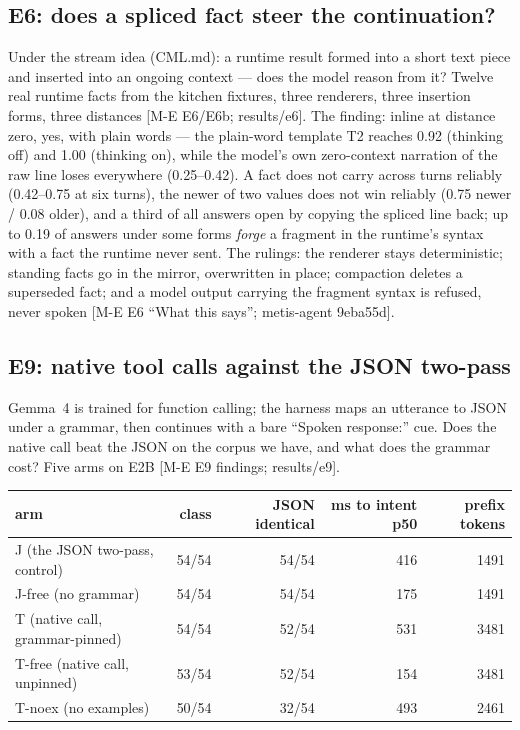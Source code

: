 \documentclass[11pt]{article}
\newcommand{\src}[1]{{\footnotesize\textsf{[#1]}}}
\begin{document}
\subsection{E6: does a spliced fact steer the continuation?}\label{sec:e6}

Under the stream idea (CML.md): a runtime result formed into a short text piece and
inserted into an ongoing context --- does the model reason from it? Twelve real runtime
facts from the kitchen fixtures, three renderers, three insertion forms, three distances
\src{M-E E6/E6b; results/e6}. The finding: inline at distance zero, yes, with plain words
--- the plain-word template T2 reaches 0.92 (thinking off) and 1.00 (thinking on), while
the model's own zero-context narration of the raw line loses everywhere (0.25--0.42). A
fact does not carry across turns reliably (0.42--0.75 at six turns), the newer of two
values does not win reliably (0.75 newer / 0.08 older), and a third of all answers open by
copying the spliced line back; up to 0.19 of answers under some forms \emph{forge} a
fragment in the runtime's syntax with a fact the runtime never sent. The rulings: the
renderer stays deterministic; standing facts go in the mirror, overwritten in place;
compaction deletes a superseded fact; and a model output carrying the fragment syntax is
refused, never spoken \src{M-E E6 ``What this says''; metis-agent 9eba55d}.

\subsection{E9: native tool calls against the JSON two-pass}\label{sec:e9}

Gemma~4 is trained for function calling; the harness maps an utterance to JSON under a
grammar, then continues with a bare ``Spoken response:'' cue. Does the native call beat
the JSON on the corpus we have, and what does the grammar cost? Five arms on E2B
\src{M-E E9 findings; results/e9}.

\begin{center}\small
\begin{tabular}{@{}lrrrr@{}}
\toprule
arm & class & JSON identical & ms to intent p50 & prefix tokens \\
\midrule
J (the JSON two-pass, control) & 54/54 & 54/54 & 416 & 1491 \\
J-free (no grammar) & 54/54 & 54/54 & 175 & 1491 \\
T (native call, grammar-pinned) & 54/54 & 52/54 & 531 & 3481 \\
T-free (native call, unpinned) & 53/54 & 52/54 & 154 & 3481 \\
T-noex (no examples) & 50/54 & 32/54 & 493 & 2461 \\
\bottomrule
\end{tabular}
\end{center}
\end{document}
